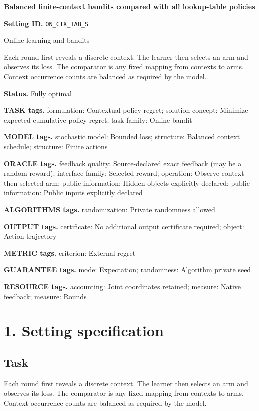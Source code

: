 \documentclass[10pt,a4paper]{article}
\begin{document}
\raggedright

{\LARGE\bfseries\sffamily\color{AtlasNavy} Balanced finite-context bandits compared with all lookup-table policies\par}\vspace{5pt}
\textbf{Setting ID.} \texttt{ON\_\allowbreak{}CTX\_\allowbreak{}TAB\_\allowbreak{}S}

Online learning and bandits

Each round first reveals a discrete context. The learner then selects an arm and observes its loss. The comparator is any fixed mapping from contexts to arms. Context occurrence counts are balanced as required by the model.

\textbf{Status.} Fully optimal

\textbf{TASK tags.} formulation: Contextual policy regret; solution concept: Minimize expected cumulative policy regret; task family: Online bandit

\textbf{MODEL tags.} stochastic model: Bounded loss; structure: Balanced context schedule; structure: Finite actions

\textbf{ORACLE tags.} feedback quality: Source-declared exact feedback (may be a random reward); interface family: Selected reward; operation: Observe context then selected arm; public information: Hidden objects explicitly declared; public information: Public inputs explicitly declared

\textbf{ALGORITHMS tags.} randomization: Private randomness allowed

\textbf{OUTPUT tags.} certificate: No additional output certificate required; object: Action trajectory

\textbf{METRIC tags.} criterion: External regret

\textbf{GUARANTEE tags.} mode: Expectation; randomness: Algorithm private seed

\textbf{RESOURCE tags.} accounting: Joint coordinates retained; measure: Native feedback; measure: Rounds

\section{1. Setting specification}
\subsection{Task}
Each round first reveals a discrete context. The learner then selects an arm and observes its loss. The comparator is any fixed mapping from contexts to arms. Context occurrence counts are balanced as required by the model.
\end{document}
